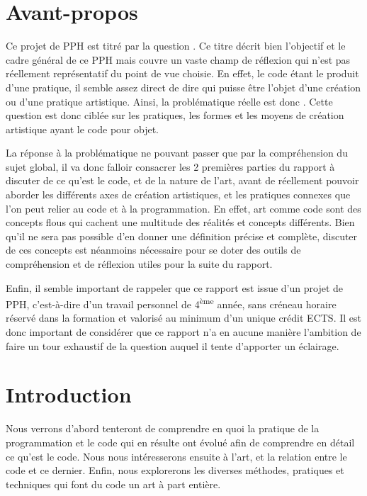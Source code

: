 \documentclass[12pt]{article} %
\newcommand{\ts}{\textsuperscript} %
\begin{document}
\section*{Avant-propos}
Ce projet de PPH est titré par la question . Ce titre décrit bien l'objectif et le cadre général de ce PPH mais couvre un vaste champ de réflexion qui n'est pas réellement représentatif du point de vue choisie. En effet, le code étant le produit d'une pratique, il semble assez direct de dire qui puisse être l'objet d'une création ou d'une pratique artistique. Ainsi, la problématique réelle est donc . Cette question est donc ciblée sur les pratiques, les formes et les moyens de création artistique ayant le code pour objet.

La réponse à la problématique ne pouvant passer que par la compréhension du sujet global, il va donc falloir consacrer les 2 premières parties du rapport à discuter de ce qu'est le code, et de la nature de l'art, avant de réellement pouvoir aborder les différents axes de création artistiques, et les pratiques connexes que l'on peut relier au code et à la programmation. En effet, art comme code sont des concepts flous qui cachent une multitude des réalités et concepts différents. Bien qu'il ne sera pas possible d'en donner une définition précise et complète, discuter de ces concepts est néanmoins nécessaire pour se doter des outils de compréhension et de réflexion utiles pour la suite du rapport.

Enfin, il semble important de rappeler que ce rapport est issue d'un projet de PPH, c'est-à-dire d'un travail personnel de 4\ts{ème} année, sans créneau horaire réservé dans la formation et valorisé au minimum d'un unique crédit ECTS. Il est donc important de considérer que ce rapport n'a en aucune manière l'ambition de faire un tour exhaustif de la question auquel il tente d'apporter un éclairage.

\newpage
\tableofcontents

\newpage
{} %

\section{Introduction}
Nous verrons d'abord tenteront de comprendre en quoi la pratique de la programmation et le code qui en résulte ont évolué afin de comprendre en détail ce qu'est le code. Nous nous intéresserons ensuite à l'art, et la relation entre le code et ce dernier. Enfin, nous explorerons les diverses méthodes, pratiques et techniques qui font du code un art à part entière.
\end{document}
